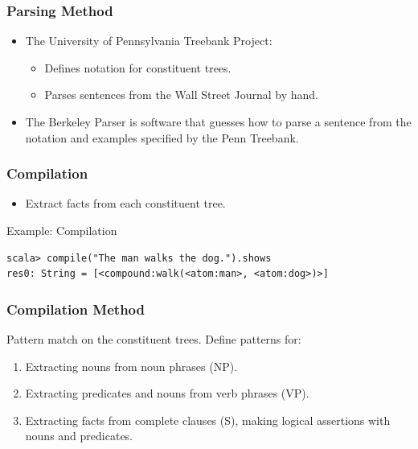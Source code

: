 \documentclass[mathserif]{beamer}
\begin{document}
\begin{frame}

\frametitle{Parsing Method}

\begin{itemize}[<+->]

\item The University of Pennsylvania Treebank Project:
\begin{itemize}[<+->]

\item Defines notation for constituent trees.
\item Parses sentences from the Wall Street Journal by hand.

\end{itemize}

\item The Berkeley Parser is software that guesses how to parse a sentence from the notation and examples specified by the Penn Treebank.

\end{itemize}

\end{frame}

\begin{frame}

\frametitle{Compilation}

\begin{itemize}[<+->]

\item Extract facts from each constituent tree.

\end{itemize}

\end{frame}

\begin{frame}[fragile]

\begin{block}{Example: Compilation}
\begin{lstlisting}
scala> compile("The man walks the dog.").shows
res0: String = [<compound:walk(<atom:man>, <atom:dog>)>]
\end{lstlisting}
\end{block}

\end{frame}

\begin{frame}

\frametitle{Compilation Method}

Pattern match on the constituent trees. Define patterns for:

\begin{enumerate}[<+->]

\item Extracting nouns from noun phrases (NP).
\item Extracting predicates and nouns from verb phrases (VP).
\item Extracting facts from complete clauses (S), making logical
assertions with nouns and predicates.

\end{enumerate}

\end{frame}
\end{document}
